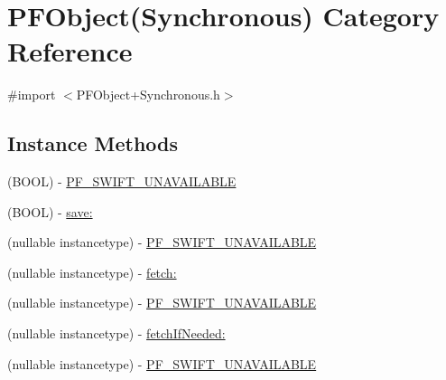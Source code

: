 \hypertarget{category_p_f_object_07_synchronous_08}{}\section{P\+F\+Object(Synchronous) Category Reference}
\label{category_p_f_object_07_synchronous_08}


{\ttfamily \#import $<$P\+F\+Object+\+Synchronous.\+h$>$}

\subsection*{Instance Methods}
\begin{DoxyCompactItemize}
\item 
(B\+O\+O\+L) -\/ \hyperlink{category_p_f_object_07_synchronous_08_adbd353cd498462b7749c7a2ad0d745d0}{P\+F\+\_\+\+S\+W\+I\+F\+T\+\_\+\+U\+N\+A\+V\+A\+I\+L\+A\+B\+L\+E}
\begin{DoxyCompactList}\small\item\em 

 \end{DoxyCompactList}\item 
(B\+O\+O\+L) -\/ \hyperlink{category_p_f_object_07_synchronous_08_a1d376c0415a13a0785ebe6a119ed3324}{save\+:}
\item 
(nullable instancetype) -\/ \hyperlink{category_p_f_object_07_synchronous_08_ad0b180e967b91e24842e7679c73749b5}{P\+F\+\_\+\+S\+W\+I\+F\+T\+\_\+\+U\+N\+A\+V\+A\+I\+L\+A\+B\+L\+E}
\begin{DoxyCompactList}\small\item\em 

 \end{DoxyCompactList}\item 
(nullable instancetype) -\/ \hyperlink{category_p_f_object_07_synchronous_08_a22919482d9b99ba9787f0f5144484099}{fetch\+:}
\item 
(nullable instancetype) -\/ \hyperlink{category_p_f_object_07_synchronous_08_ad0b180e967b91e24842e7679c73749b5}{P\+F\+\_\+\+S\+W\+I\+F\+T\+\_\+\+U\+N\+A\+V\+A\+I\+L\+A\+B\+L\+E}
\item 
(nullable instancetype) -\/ \hyperlink{category_p_f_object_07_synchronous_08_a41bf492b240772ee98a8f6b2728101a8}{fetch\+If\+Needed\+:}
\item 
(nullable instancetype) -\/ \hyperlink{category_p_f_object_07_synchronous_08_ad0b180e967b91e24842e7679c73749b5}{P\+F\+\_\+\+S\+W\+I\+F\+T\+\_\+\+U\+N\+A\+V\+A\+I\+L\+A\+B\+L\+E}
\begin{DoxyCompactList}\small\item\em 


\end{DoxyCompactList}
\end{DoxyCompactItemize}
